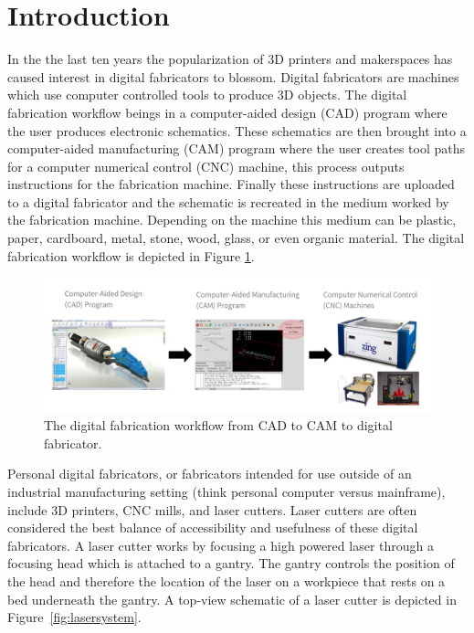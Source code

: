 \section{Introduction}

In the the last ten years the popularization of 3D printers and makerspaces has caused interest in digital fabricators to blossom. Digital fabricators are machines which use computer controlled tools to produce 3D objects. The digital fabrication workflow beings in a computer-aided design (CAD) program where the user produces electronic schematics. These schematics are then brought into a computer-aided manufacturing (CAM) program where the user creates tool paths for a computer numerical control (CNC) machine, this process outputs instructions for the fabrication machine. Finally these instructions are uploaded to a digital fabricator and the schematic is recreated in the medium worked by the fabrication machine. Depending on the machine this medium can be plastic, paper, cardboard, metal, stone, wood, glass, or even organic material. The digital fabrication workflow is depicted in Figure \ref{fig:digiFabWorkflow}.

\begin{figure}[H]
  \includegraphics[width=\linewidth]{digiFabWorkflow.jpg}
  \caption{The digital fabrication workflow from CAD to CAM to digital fabricator.}
  \label{fig:digiFabWorkflow}
\end{figure}

Personal digital fabricators, or fabricators intended for use outside of an industrial manufacturing setting (think personal computer versus mainframe), include 3D printers, CNC mills, and laser cutters. Laser cutters are often considered the best balance of accessibility and usefulness of these digital fabricators. A laser cutter works by focusing a high powered laser through a focusing head which is attached to a gantry. The gantry controls the position of the head and therefore the location of the laser on a workpiece that rests on a bed underneath the gantry. A top-view schematic of a laser cutter is depicted in Figure~\ref{fig:lasersystem}.

